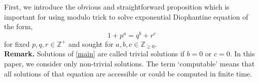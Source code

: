 \documentclass[12pt]{article}
\begin{document}
\hspace*{0.5cm} First, we introduce the obvious and straightforward proposition which is important for using modulo trick to solve exponential Diophantine equation of the form,
\begin{equation}
    1+p^a = q^b + r^c \label{main}
\end{equation}
for fixed $p,q,r\in \mathbb{Z}^+$ and sought for $a,b,c \in \mathbb{Z}_{\geq 0 }$.\\
\textbf{Remark. }Solutions of \eqref{main} are called trivial solutions if $b=0$ or $c=0$. In this paper, we consider only non-trivial solutions. The term `computable' means that all solutions of that equation are accessible or could be computed in finite time. \\
\theoremstyle{plain}
\newtheorem{lemma}{Lemma}
\newtheorem{proposition}{Proposition}
\newtheorem{corollary}{Corollary}
\newtheorem{theorem}{Theorem}
\end{document}
